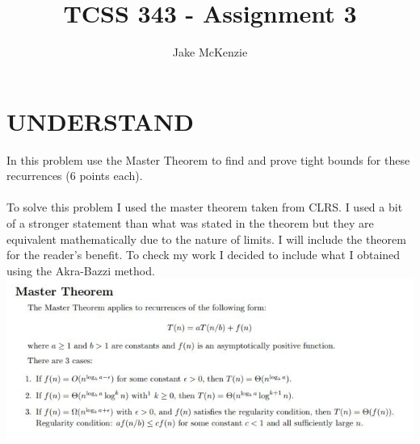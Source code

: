 \documentclass[paper=a4,fontsize=11pt]{article}
\begin{document}
\title{TCSS 343 - Assignment 3}
\author{Jake McKenzie}
\maketitle
\section{UNDERSTAND}
In this problem use the Master Theorem to find and prove tight bounds for these recurrences (6 points each).\\\\
To solve this problem I used the master theorem taken from CLRS. I used a bit of a stronger statement than what was stated in the theorem but they are equivalent mathematically due to the nature of limits. I will include the theorem for the reader's benefit. To check my work I decided to include what I obtained using the Akra-Bazzi method.\\
\includegraphics[width=\linewidth]{mastertheorem.JPG}
\end{document}
